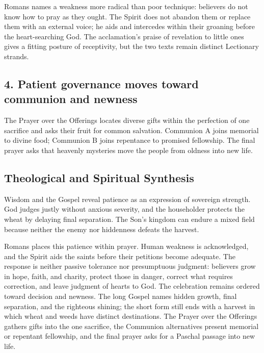 \begin{deepstudy}
Romans names a weakness more radical than poor technique: believers do not know how to pray as they ought. The Spirit does not abandon them or replace them with an external voice; he aids and intercedes within their groaning before the heart-searching God. The acclamation's praise of revelation to little ones gives a fitting posture of receptivity, but the two texts remain distinct Lectionary strands.

\subsection*{4. Patient governance moves toward communion and newness\enspace{}}

The Prayer over the Offerings locates diverse gifts within the perfection of one sacrifice and asks their fruit for common salvation. Communion A joins memorial to divine food; Communion B joins repentance to promised fellowship. The final prayer asks that heavenly mysteries move the people from oldness into new life.

\clearpage
\subsection*{Theological and Spiritual Synthesis}

Wisdom and the Gospel reveal patience as an expression of sovereign strength. God judges justly without anxious severity, and the householder protects the wheat by delaying final separation. The Son's kingdom can endure a mixed field because neither the enemy nor hiddenness defeats the harvest.

Romans places this patience within prayer. Human weakness is acknowledged, and the Spirit aids the saints before their petitions become adequate. The response is neither passive tolerance nor presumptuous judgment: believers grow in hope, faith, and charity, protect those in danger, correct what requires correction, and leave judgment of hearts to God.
The celebration remains ordered toward decision and newness. The long Gospel names hidden growth, final separation, and the righteous shining; the short form still ends with a harvest in which wheat and weeds have distinct destinations. The Prayer over the Offerings gathers gifts into the one sacrifice, the Communion alternatives present memorial or repentant fellowship, and the final prayer asks for a Paschal passage into new life.


\end{deepstudy}
